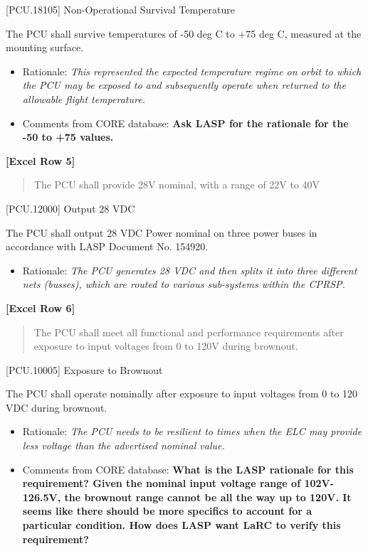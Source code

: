 [PCU.18105] Non-Operational Survival Temperature

The PCU shall survive temperatures of -50 deg C to +75 deg C, measured at the mounting surface.

\begin{itemize}
\item{} Rationale: \emph{This represented the expected temperature regime on orbit to which the PCU may be exposed to and subsequently operate when returned to the allowable flight temperature.}

\item{} Comments from CORE database: \textbf{Ask LASP for the rationale for the -50 to +75 values.}

\end{itemize}

\textbf{[Excel Row 5]}

\begin{quote}
The PCU shall provide 28V nominal, with a range of 22V to 40V
\end{quote}

[PCU.12000] Output 28 VDC

The PCU shall output 28 VDC Power nominal on three power buses in accordance with LASP Document No. 154920.

\begin{itemize}
\item{} Rationale: \emph{The PCU generates 28 VDC and then splits it into three different nets (busses), which are routed to various sub-systems within the CPRSP.}

\end{itemize}

\textbf{[Excel Row 6]}

\begin{quote}
The PCU shall meet all functional and performance requirements after exposure to input voltages from 0 to 120V during brownout.
\end{quote}

[PCU.10005] Exposure to Brownout

The PCU shall operate nominally after exposure to input voltages from 0 to 120 VDC during brownout.

\begin{itemize}
\item{} Rationale: \emph{The PCU needs to be resilient to times when the ELC may provide less voltage than the advertised nominal value.}

\item{} Comments from CORE database: \textbf{What is the LASP rationale for this requirement? Given the nominal input voltage range of 102V-126.5V, the brownout range cannot be all the way up to 120V. It seems like there should be more specifics to account for a particular condition. How does LASP want LaRC to verify this requirement?}

\end{itemize}

